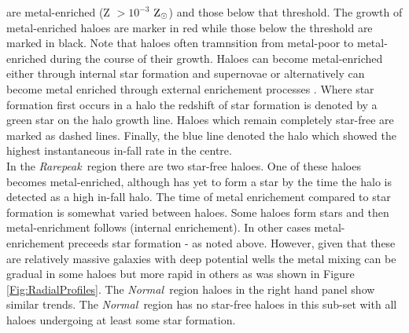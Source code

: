 \documentclass[graphics, twocolumn, usenatbib]{mn2e}
\newcommand{\zsolarc} {$\rm{Z_{\odot}}$}
\newcommand{\rarepeak} {\textit{Rarepeak~}}
\newcommand{\normal} {\textit{Normal~}}
\begin{document}
are metal-enriched (Z $> 10^{-3}$ \zsolarc) and those below that threshold. The growth of
metal-enriched haloes are marker in red while those below the threshold are marked in black. Note
that haloes often tramnsition from metal-poor to metal-enriched during the course of their growth. 
Haloes can become metal-enriched either through internal star formation and
supernovae or alternatively can become metal enriched through external enrichement processes
\citep[e.g.][]{Smith_2015}. Where star formation first
occurs in a halo the redshift of star formation is denoted by a green star on the halo growth line. 
Haloes which remain completely star-free are marked as dashed lines. Finally, the blue line denoted
the halo which showed the highest instantaneous in-fall rate in the centre. \\
\indent In the \rarepeak region there are two
star-free haloes. One of these haloes becomes metal-enriched, although has yet to form
a star by the time the halo is detected as a high in-fall halo. The time of metal enrichement
compared to star formation is somewhat varied between haloes. Some haloes form stars and then
metal-enrichment follows (internal enrichement). In other cases metal-enrichement preceeds
star formation - as noted above.
However, given that these are relatively massive galaxies with deep potential wells
the metal mixing can be gradual in some haloes but more rapid in others as was shown in Figure
\ref{Fig:RadialProfiles}. The \normal region haloes in the right hand panel show similar trends.
The \normal region has no star-free haloes in this sub-set with all haloes undergoing at
least some star formation. 
\end{document}
